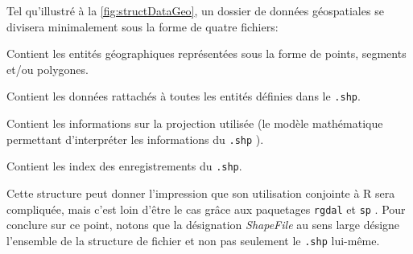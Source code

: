 
Tel qu'illustré à la \autoref{fig:structDataGeo}, un dossier de données géospatiales se divisera minimalement sous la forme de quatre fichiers:
\begin{description}[style=multiline,leftmargin=1.5cm]
	\item[\texttt{.shp}] Contient les entités géographiques représentées sous la forme de points, segments et/ou polygones.
	\item[\texttt{.dbf}] Contient les données rattachés à toutes les entités définies dans le \texttt{.shp}.
	\item[\texttt{.prj}] Contient les informations sur la projection utilisée (le modèle mathématique permettant d'interpréter les informations du \texttt{.shp} \cite{projectionSIG}).
	\item[{.shx}] Contient les index des enregistrements du \texttt{.shp}.
\end{description}
Cette structure peut donner l'impression que son utilisation conjointe à R sera compliquée, mais c'est loin d'être le cas grâce aux paquetages \texttt{rgdal} \cite{pkgR:rgdal} et \texttt{sp}\cite{pkgR:sp} . Pour conclure sur ce point, notons que la désignation \emph{ShapeFile} au sens large désigne l'ensemble de la structure de fichier et non pas seulement le \texttt{.shp} lui-même. \cite{portailSIG} \\

